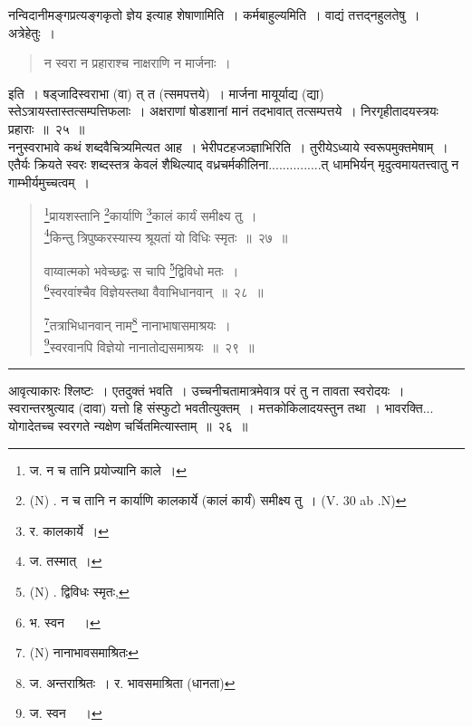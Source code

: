 \documentclass[11pt, openany]{book}
\begin{document}
नन्विदानीमङ्गप्रत्यङ्गकृतो ज्ञेय इत्याह शेषाणामिति~। {\qtt कर्मबाहुल्यमिति}~। वाद्यं तत्तद्नहुलतेषु~। {\qtt अत्रेहेतुः}~।

\begin{quote}
{\qt न स्वरा न प्रहाराश्च नाक्षराणि न मार्जनाः~।}
\end{quote}

\noindent
इति~। षड्जादिस्वराभा (वा) त् त (त्समपत्तये)~। {\qtt मार्जना} मायूर्याद्य (द्या) स्तेऽत्रायस्तास्तत्सम्पत्तिफलाः~। अक्षराणां षोडशानां मानं तदभावात् तत्सम्पत्तये~। निरगृहीतादयस्त्रयः प्रहाराः~॥~२५~॥\\

ननुस्वराभावे कथं शब्दवैचित्र्यमित्यत आह~। {\qtt भेरीपटहजञ्ज्ञाभिरिति}~। तुरीयेऽध्याये स्वरूपमुक्तमेषाम्~। एतैर्यः क्रियते स्वरः शब्दस्तत्र केवलं शैथिल्याद् वध्रचर्मकीलिना...............त् धामभिर्यन् मृदुत्वमायतत्त्वातु न गाम्भीर्यमुच्चत्वम्~।

\newpage

\begin{quote}
{\na \renewcommand{\thefootnote}{1}\footnote{ज. न च तानि प्रयोज्यानि काले~।}प्रायशस्तानि \renewcommand{\thefootnote}{1a}\footnote{(N) . न च तानि न कार्याणि कालकार्ये (कालं कार्यं) समीक्ष्य तु~। (V. 30 ab .N)}कार्याणि \renewcommand{\thefootnote}{2}\footnote{र. कालकार्ये~।}कालं कार्यं समीक्ष्य तु~।\\
 \renewcommand{\thefootnote}{3}\footnote{ज. तस्मात्~।}किन्तु त्रिपुष्करस्यास्य श्रूयतां यो विधिः स्मृतः~॥~२७~॥

 वाय्वात्मको भवेच्छद्वः स चापि \renewcommand{\thefootnote}{3a}\footnote{(N) . द्विविधः स्मृतः,}द्विविधो मतः~।\\
 \renewcommand{\thefootnote}{4}\footnote{भ. स्वन \textendash\ ~।}स्वरवांश्चैव विज्ञेयस्तथा वैवाभिधानवान्~॥~२८~॥

 \renewcommand{\thefootnote}{5a}\footnote{(N) नानाभावसमाश्रितः}तत्राभिधानवान् नाम\renewcommand{\thefootnote}{5}\footnote{ज. अन्तराश्रितः~। र. भावसमाश्रिता (धानता)} नानाभाषासमाश्रयः~।\\
 \renewcommand{\thefootnote}{6}\footnote{ज. स्वन \textendash\ ~।}स्वरवानपि विज्ञेयो नानातोद्यसमाश्रयः~॥~२९~॥}
\end{quote}

\hrule

\vspace{2mm}
\noindent
आवृत्याकारः श्लिष्टः~। एतदुक्तं भवति~। उच्चनीचतामात्रमेवात्र परं तु न तावता स्वरोदयः~। स्वरान्तरश्रुत्याद (दावा) यत्तो हि संस्फुटो भवतीत्युक्तम्~। मत्तकोकिलादयस्तुन तथा~। भावरक्ति... योगादेतच्च स्वरगते न्यक्षेण चर्चितमित्यास्ताम्~॥~२६~॥\\
\end{document}
